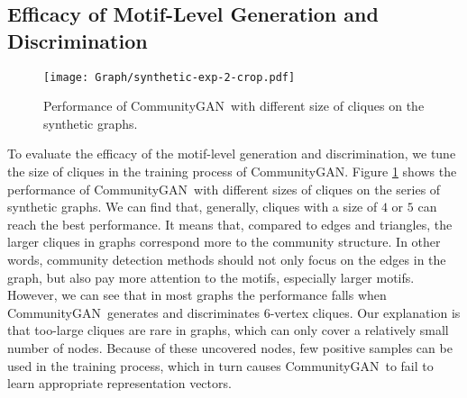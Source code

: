 \documentclass[sigconf]{acmart}
\newcommand{\ComGAN}{CommunityGAN}
\begin{document}
\subsection{Efficacy of Motif-Level Generation and Discrimination}

\begin{figure}[tbp]
\texttt{[image: Graph/synthetic-exp-2-crop.pdf]}
\caption{Performance of \ComGAN~with different size of cliques on the synthetic graphs.}
\label{fig:synthetic-data-2}
\end{figure}

To evaluate the efficacy of the motif-level generation and discrimination, we tune the size of cliques in the training process of \ComGAN.
Figure \ref{fig:synthetic-data-2} shows the performance of \ComGAN~with different sizes of cliques on the series of synthetic graphs.
We can find that, generally, cliques with a size of $4$ or $5$ can reach the best performance.
It means that, compared to edges and triangles, the larger cliques in graphs correspond more to the community structure.
In other words, community detection methods should not only focus on the edges in the graph, but also pay more attention to the motifs, especially larger motifs.
However, we can see that in most graphs the performance falls when \ComGAN~generates and discriminates 6-vertex cliques.
Our explanation is that too-large cliques are rare in graphs, which can only cover a relatively small number of nodes.
Because of these uncovered nodes, few positive samples can be used in the training process, which in turn causes \ComGAN~to fail to learn appropriate representation vectors.
\end{document}
